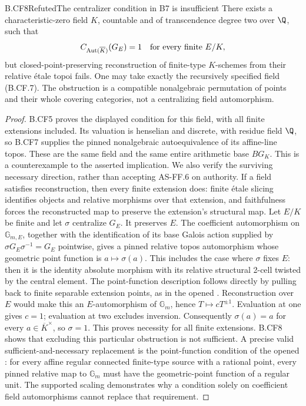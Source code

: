 \begin{claim}{B.CF8}{Refuted}{The centralizer condition in B7 is insufficient}
There exists a characteristic-zero field \(K\), countable and of
transcendence degree two over \(\Q\), such that
\[
 C_{\operatorname{Aut}(\overline K)}(G_E)=1
           \quad\hbox{for every finite }E/K,
\]
but closed-point-preserving reconstruction of finite-type
\(K\)-schemes from their relative étale topoi fails. One may take
exactly the recursively specified field (B.CF.7). The obstruction
is a compatible nonalgebraic permutation of points and their
whole covering categories, not a centralizing field automorphism.
\end{claim}
\begin{proof}
B.CF5 proves the displayed condition for this field, with all
finite extensions included. Its valuation is henselian and
discrete, with residue field \(\Q\), so B.CF7 supplies the
pinned nonalgebraic autoequivalence of its affine-line topos.
These are the same field and the same entire arithmetic base
\(BG_K\). This is a counterexample to the asserted implication.
We also verify the surviving necessary direction, rather than
accepting AS-FF.6 on authority. If a field satisfies reconstruction,
then every finite extension does: finite étale slicing identifies
objects and relative morphisms over that extension, and faithfulness
forces the reconstructed map to preserve the extension's structural
map. Let \(E/K\) be finite and let \(\sigma\) centralize
\(G_E\). It preserves \(E\). The coefficient automorphism on
\(\mathbb G_{m,E}\), together with the identification of its
base Galois action supplied by \(\sigma G_E\sigma^{-1}=G_E\)
pointwise, gives a pinned relative topos automorphism whose geometric
point function is \(a\mapsto\sigma(a)\). This includes the case
where \(\sigma\) fixes \(E\): then it is the identity absolute
morphism with its relative structural 2-cell twisted by the central
element. The point-function description follows directly by pulling
back to finite separable extension points, as in the opened
\citep[Proposition~3.6]{CarlsonHaineWolf2024}.
Reconstruction over \(E\) would make this an \(E\)-automorphism
of \(\mathbb G_m\), hence \(T\mapsto cT^{\pm1}\).
Evaluation at one gives \(c=1\); evaluation at two excludes
inversion. Consequently \(\sigma(a)=a\) for every
\(a\in\overline K^\times\), so \(\sigma=1\).
This proves necessity for all finite extensions. B.CF8 shows that
excluding this particular obstruction is not sufficient.
A precise valid sufficient-and-necessary replacement is the
point-function condition of the opened
\citep[Theorem~4.18(5)]{CarlsonHaineWolf2024}: for every affine
regular connected finite-type source with a rational point,
every pinned relative map to \(\mathbb G_m\) must have the
geometric-point function of a regular unit. The supported
scaling demonstrates why a condition solely on coefficient
field automorphisms cannot replace that requirement.
\end{proof}

